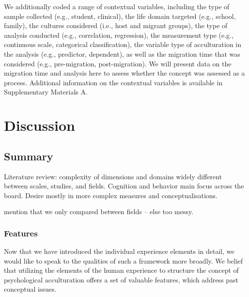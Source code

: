 \documentclass[man, 12pt, a4paper]{apa7}
\begin{document}
We additionally coded a range of contextual variables, including the type of sample collected (e.g., student, clinical), the life domain targeted (e.g., school, family), the cultures considered (i.e., host and migrant groups), the type of analysis conducted (e.g., correlation, regression), the measurement type (e.g., continuous scale, categorical classification), the variable type of acculturation in the analysis (e.g., predictor, dependent), as well as the migration time that was considered (e.g., pre-migration, post-migration). We will present data on the migration time and analysis here to assess whether the concept was assessed as a process. Additional information on the contextual variables is available in Supplementary Materials A.



\section{Discussion}

\subsection{Summary}

Literature review: complexity of dimensions and domains widely different between scales, studies, and fields. Cognition and behavior main focus across the board. Desire mostly in more complex measures and conceptualisations.

mention that we only compared between fields -- else too messy.


\subsubsection{Features}
Now that we have introduced the individual experience elements in detail, we would like to speak to the qualities of such a framework more broadly. We belief that utilizing the elements of the human experience to structure the concept of psychological acculturation offers a set of valuable features, which address past conceptual issues. 
\end{document}
